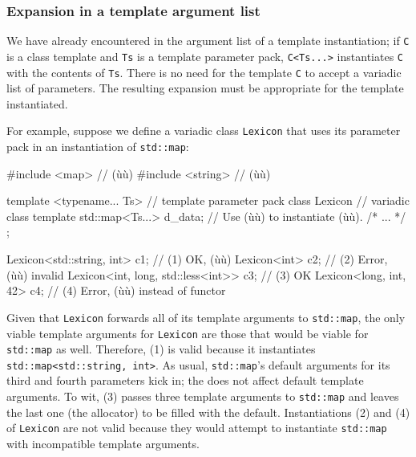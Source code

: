 \subsubsection[Expansion in a template argument list]{Expansion in a template argument list}\label{expansion-in-a-template-argument-list}

We have already encountered  in the argument list
of a template instantiation; if \lstinline!C! is a class template and
\lstinline!Ts! is a template parameter pack, \lstinline!C<Ts...>! instantiates
\lstinline!C! with the contents of \lstinline!Ts!. There is no need for the
template \lstinline!C! to accept a variadic list of parameters. The
resulting expansion must be appropriate for the template instantiated.

For example, suppose we define a variadic class \lstinline!Lexicon! that
uses its parameter pack in an instantiation of \lstinline!std::map!:

\begin{emcppslisting}
#include <map>     // (ù{}ù)
#include <string>  // (ù{}ù)

template <typename... Ts>               // template parameter pack
class Lexicon                           // variadic class template
{
    std::map<Ts...> d_data;             // Use (ù{}ù) to instantiate (ù{}ù).
    /* ... */
};

Lexicon<std::string, int> c1;           // (1) OK, (ù{}ù)
Lexicon<int> c2;                        // (2) Error, (ù{}ù) invalid
Lexicon<int, long, std::less<int>> c3;  // (3) OK
Lexicon<long, int, 42> c4;              // (4) Error, (ù{}ù) instead of functor
\end{emcppslisting}
    

\noindent Given that \lstinline!Lexicon! forwards all of its template arguments to
\lstinline!std::map!, the only viable template arguments for
\lstinline!Lexicon! are those that would be viable for \lstinline!std::map! as
well. Therefore, (1) is valid because it instantiates
\lstinline!std::map<std::string,!~\lstinline!int>!. As usual,
\lstinline!std::map!'s default arguments for its third and fourth
parameters kick in; the  does not affect default
template arguments. To wit, (3) passes three template arguments to
\lstinline!std::map! and leaves the last one (the allocator) to be filled
with the default. Instantiations (2) and (4) of \lstinline!Lexicon! are not
valid because they would attempt to instantiate \lstinline!std::map! with
incompatible template arguments.

